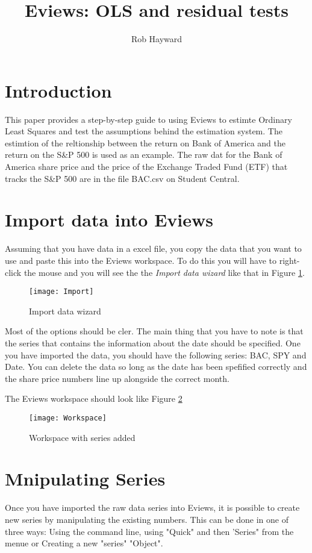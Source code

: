 \documentclass{article}\usepackage[]{graphicx}\usepackage[]{color}
\title{Eviews: OLS and residual tests}
\author{Rob Hayward}
\date{}
\begin{document}
\doublespace
\maketitle
\section*{Introduction}
This paper provides a step-by-step guide to using Eviews to estimte Ordinary Least Squares and test the assumptions behind the estimation system.  The estimtion of the reltionship between the return on Bank of America and the return on the S\&P 500 is used as an example. The raw dat for the Bank of America share price and the price of the Exchange Traded Fund (ETF) that tracks the S\&P 500 are in the file BAC.csv on Student Central. 

\section*{Import data into Eviews}
Assuming that you have data in a excel file, you copy the data that you want to use and paste this into the Eviews workspace. To do this you will have to right-click the mouse and you will see the the \emph{Import data wizard} like that in Figure \ref{import}. 

\begin{figure}[h!]
\graphicspath{{"../Eviews/Figures/"}}
\centering
\texttt{[image: Import]}
\caption{Import data wizard}
\label{import}
\end{figure}

Most of the options should be cler. The main thing that you have to note is that the series that contains the information about the date should be specified.  One you have imported the data, you should have the following series: BAC, SPY and Date.  You can delete the data so long as the date has been spefified correctly and the share price numbers line up alongside the correct month.

The Eviews workspace should look like Figure \ref{WP}

\begin{figure}[h!]
\graphicspath{{"../Eviews/Figures/"}}
\centering
\texttt{[image: Workspace]}
\caption{Workspace with series added}
\label{WP}
\end{figure}

\section{Mnipulating Series}
Once you have imported the raw data series into Eviews, it is possible to create new series by manipulating the existing numbers.  This can be done in one of three ways:  Using the command line, using "Quick" and then 'Series" from the menue or Creating a new "series" "Object".  
\end{document}
